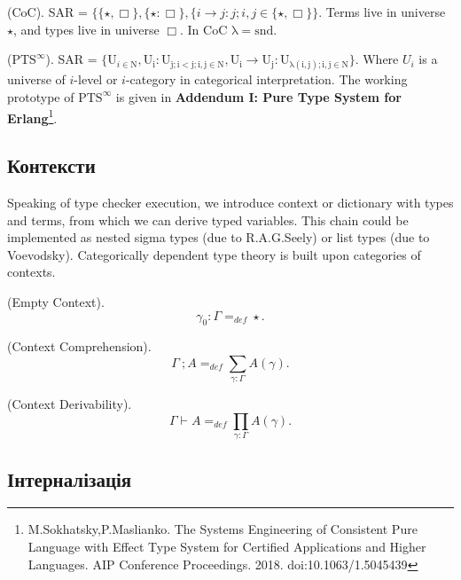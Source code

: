 \begin{example} (CoC). SAR = $\{ \{\star , \Box \},\{ \star : \Box \},
        \{ i \rightarrow j : j; i, j \in \{ \star, \Box \}
        \}$. Terms live in universe $\star$, and types live in universe $\Box$. In CoC $\mathrm{\lambda=snd}$.
\end{example}

\begin{example} ($\mathrm{PTS}^\infty$). SAR = $\{ \mathrm{U}_{i \in \mathrm{N}},
    \mathrm{U_i : U_{j; i < j; i,j \in N}},
    \mathrm{U_i} \rightarrow \mathrm{U_j} : \mathrm{U_{\lambda(i,j); i,j \in \mathrm{N}}}
    \}$. Where $U_i$ is a universe of $i$-level or $i$-category in categorical interpretation.
    The working prototype of $\mathrm{PTS}^\infty$ is given in
    \textbf{Addendum I: Pure Type System for Erlang}\footnote{M.Sokhatsky,P.Maslianko. The Systems Engineering of Consistent Pure Language with Effect Type System for Certified Applications and Higher Languages. AIP Conference Proceedings. 2018.
    doi:10.1063/1.5045439}.
\end{example}

\subsection{Контексти}

Speaking of type checker execution, we introduce context or dictionary with types and terms,
from which we can derive typed variables. This chain could be implemented as
nested sigma types (due to R.A.G.Seely) or list types (due to Voevodsky). Categorically
dependent type theory is built upon categories of contexts.

\begin{definition} (Empty Context).
$$
    \gamma_0 : \Gamma =_{def} \star.
$$
\end{definition}

\begin{definition} (Context Comprehension).
$$
\Gamma\ ; A =_{def} \sum_{\gamma:\Gamma}A(\gamma).
$$
\end{definition}

\begin{definition} (Context Derivability).
$$
\Gamma \vdash A =_{def} \prod_{\gamma:\Gamma}A(\gamma).
$$
\end{definition}

\subsection{Інтерналізація}

